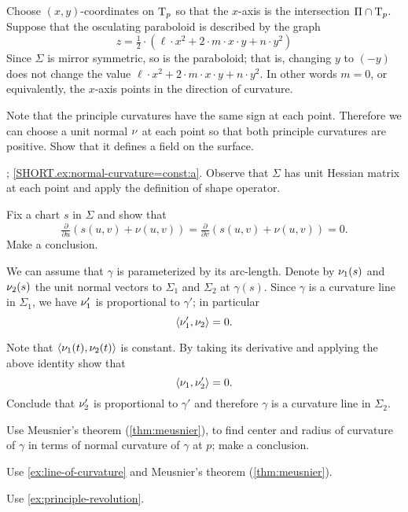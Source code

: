 Choose $(x,y)$-coordinates on $\mathrm{T}_p$ so that the $x$-axis is the intersection $\Pi\cap  \mathrm{T}_p$.
Suppose that the osculating paraboloid is described by the graph 
\[z=\tfrac12\cdot(\ell\cdot x^2+2\cdot m\cdot x\cdot y+n\cdot y^2)\]
Since $\Sigma$ is mirror symmetric, so is the paraboloid;
that is, changing $y$ to $(-y)$ does not change the value 
$\ell\cdot x^2+2\cdot m\cdot x\cdot y+n\cdot y^2$.
In other words $m=0$, or equivalently, the $x$-axis points in the direction of curvature.

 Note that the principle curvatures have the same sign at each point.
Therefore we can choose a unit normal $\nu$ at each point so that both principle curvatures are positive.
Show that it defines a field on the surface.


\parbf{\ref{ex:normal-curvature=const}}; \ref{SHORT.ex:normal-curvature=const:a}.
Observe that $\Sigma$ has unit Hessian matrix at each point and apply the definition of shape operator.

 Fix a chart $s$ in $\Sigma$ and show that 
\[\tfrac{\partial }{\partial u}(s(u,v)+\nu(u,v))
=
\tfrac{\partial }{\partial v}(s(u,v)+\nu(u,v))
=
0.\]
Make a conclusion.

We can assume that $\gamma$ is parameterized by its arc-length.
Denote by $\nu_1(s)$ and $\nu_2(s)$ the unit normal vectors to $\Sigma_1$ and $\Sigma_2$ at $\gamma(s)$.
Since $\gamma$ is a curvature line in $\Sigma_1$, we have 
$\nu_1'$ is proportional to $\gamma'$;
in particular 
\[\langle\nu_1',\nu_2\rangle=0.\]

Note that $\langle \nu_1(t),\nu_2(t)\rangle$ is constant.
By taking its derivative and applying the above identity show that
\[\langle\nu_1,\nu_2'\rangle=0.\]
Conclude that $\nu_2'$ is proportional to $\gamma'$
and therefore $\gamma$ is a curvature line in $\Sigma_2$.


 Use Meusnier's theorem (\ref{thm:meusnier}), to find center and radius of curvature of $\gamma$ in terms of normal curvature of $\gamma$ at $p$;
make a conclusion.

Use \ref{ex:line-of-curvature} and Meusnier's theorem (\ref{thm:meusnier}).

 Use \ref{ex:principle-revolution}.

